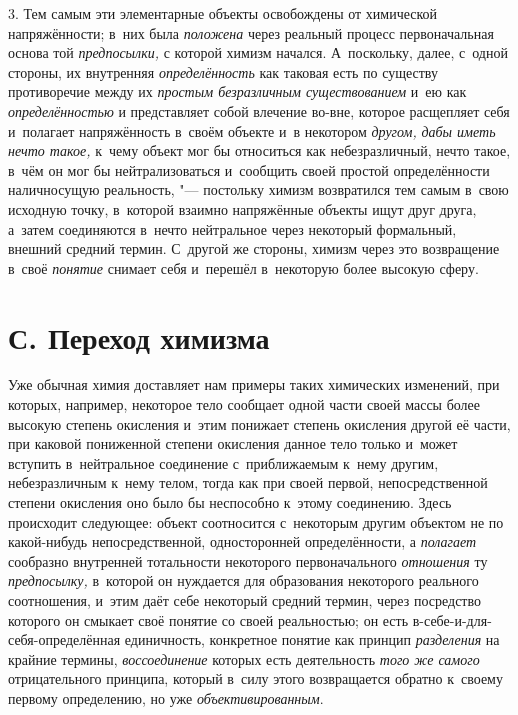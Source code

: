 3. Тем самым эти элементарные объекты освобождены от
химической напряжённости; в~них была
{\em положена} через
реальный процесс первоначальная основа той
{\em предпосылки,} с
которой химизм начался. А~поскольку, далее, с~одной стороны, их внутренняя
{\em определённость} как
таковая есть по существу противоречие между их
{\em простым безразличным
существованием} и~ею как
{\em определённостью} и
представляет собой влечение во-вне, которое расщепляет себя и~полагает
напряжённость в~своём объекте и~в некотором
{\em другом,}
{\em дабы иметь нечто такое,}
к~чему объект мог бы относиться как небезразличный, нечто
такое, в~чём он мог бы нейтрализоваться и~сообщить своей простой
определённости наличносущую реальность, "--- постольку химизм
возвратился тем самым в~свою исходную точку, в~которой взаимно напряжённые
объекты ищут друг друга, а~затем соединяются в~нечто нейтральное через
некоторый формальный, внешний средний термин. С~другой же стороны, химизм
через это возвращение в~своё
{\em понятие} снимает
себя и~перешёл в~некоторую более высокую сферу.

\section[С. Переход химизма]{С. Переход химизма}

Уже обычная химия доставляет нам примеры таких химических
изменений, при которых, например, некоторое тело сообщает одной части своей
массы более высокую степень окисления и~этим понижает степень окисления
другой её части, при каковой пониженной степени окисления данное тело
только и~может вступить в~нейтральное соединение с~приближаемым к~нему
другим, небезразличным к~нему телом, тогда как при своей первой,
непосредственной степени окисления оно было бы неспособно к~этому
соединению. Здесь происходит следующее: объект соотносится с~некоторым
другим объектом не по какой-нибудь непосредственной, односторонней
определённости, а {\em полагает}
сообразно внутренней тотальности некоторого
первоначального {\em отношения}
ту {\em предпосылку,}
в~которой он нуждается для образования некоторого реального
соотношения, и~этим даёт себе некоторый средний термин, через посредство
которого он смыкает своё понятие со своей реальностью; он есть
в-себе-и-для-себя-определённая единичность, конкретное понятие
как принцип {\em разделения}
на крайние термины,
{\em воссоединение}
которых есть деятельность
{\em того же самого}
отрицательного принципа, который в~силу этого возвращается
обратно к~своему первому определению, но уже
{\em объективированным}.


